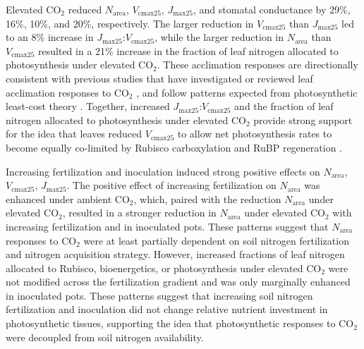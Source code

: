 Elevated CO$_2$ reduced $N_\mathrm{area}$, $V_\mathrm{cmax25}$, $J_\mathrm{max25}$, and stomatal conductance by 29\%, 16\%, 10\%, and 20\%, respectively. The larger reduction in $V_\mathrm{cmax25}$ than $J_\mathrm{max25}$ led to an 8\% increase in $J_\mathrm{max25}$:$V_\mathrm{cmax25}$, while the larger reduction in $N_\mathrm{area}$ than $V_\mathrm{cmax25}$ resulted in a 21\% increase in the fraction of leaf nitrogen allocated to photosynthesis under elevated CO$_2$. These acclimation responses are directionally consistent with previous studies that have investigated or reviewed leaf acclimation responses to CO$_2$ , and follow patterns expected from photosynthetic least-cost theory . Together, increased $J_\mathrm{max25}$:$V_\mathrm{cmax25}$ and the fraction of leaf nitrogen allocated to photosynthesis under elevated CO$_2$ provide strong support for the idea that leaves reduced $V_\mathrm{cmax25}$ to allow net photosynthesis rates to become equally co-limited by Rubisco carboxylation and RuBP regeneration .

Increasing fertilization and inoculation induced strong positive effects on $N_\mathrm{area}$, $V_\mathrm{cmax25}$, $J_\mathrm{max25}$. The positive effect of increasing fertilization on $N_\mathrm{area}$ was enhanced under ambient CO$_2$, which, paired with the  reduction $N_\mathrm{area}$ under elevated CO$_2$, resulted in a stronger reduction in $N_\mathrm{area}$ under elevated CO$_2$ with increasing fertilization and in inoculated pots. These patterns suggest that $N_\mathrm{area}$ responses to CO$_2$ were at least partially dependent on soil nitrogen fertilization and nitrogen acquisition strategy. However, increased fractions of leaf nitrogen allocated to Rubisco, bioenergetics, or photosynthesis under elevated CO$_2$ were not modified across the fertilization gradient and was only marginally enhanced in inoculated pots. These patterns suggest that increasing soil nitrogen fertilization and inoculation did not change relative nutrient investment in photosynthetic tissues, supporting the idea that photosynthetic responses to CO$_2$ were decoupled from soil nitrogen availability.

